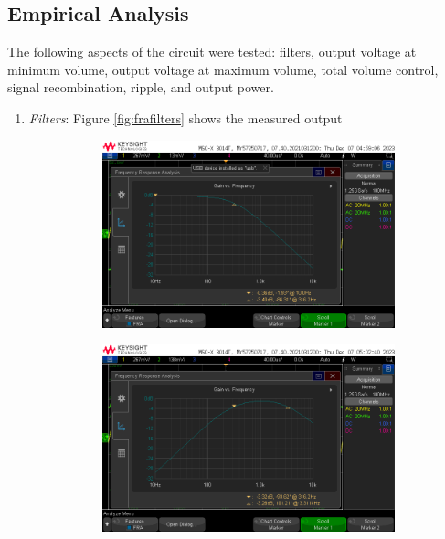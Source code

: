\documentclass[notitlepage, 12pt]{report}
\begin{document}
\subsection*{Empirical Analysis}
The following aspects of the circuit were tested: filters, output voltage at minimum volume, 
output voltage at maximum volume, total volume control, signal recombination, ripple, and output power.  
\begin{enumerate}
    \item \emph{Filters}: Figure \ref{fig:frafilters} shows the measured output
    \begin{figure}    
        \begin{subfigure}{0.3\textwidth}
            \includegraphics[scale=0.2]{images/lowpass.png}
        \end{subfigure}
        \hfill
        \begin{subfigure}{0.3\textwidth}
            \includegraphics[scale=0.2]{images/bandpass.png}

\end{subfigure}
\end{figure}
\end{enumerate}
\end{document}
